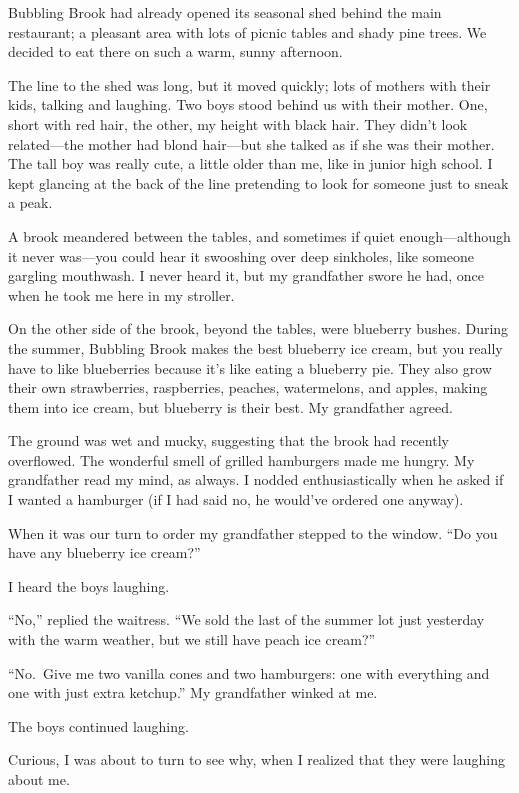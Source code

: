 Bubbling Brook had already opened its seasonal shed behind the main
restaurant; a pleasant area with lots of picnic tables and shady pine
trees. We decided to eat there on such a warm, sunny afternoon.

The line to the shed was long, but it moved quickly; lots of mothers
with their kids, talking and laughing. Two boys stood behind us with
their mother. One, short with red hair, the other, my height with black
hair. They didn't look related---the mother had blond hair---but she
talked as if she was their mother. The tall boy was really cute, a
little older than me, like in junior high school. I kept glancing at the
back of the line pretending to look for someone just to sneak a peak.

A brook meandered between the tables, and sometimes if quiet
enough---although it never was---you could hear it swooshing over deep
sinkholes, like someone gargling mouthwash. I never heard it, but my
grandfather swore he had, once when he took me here in my stroller.

On the other side of the brook, beyond the tables, were blueberry
bushes. During the summer, Bubbling Brook makes the best blueberry ice
cream, but you really have to like blueberries because it's like eating
a blueberry pie. They also grow their own strawberries, raspberries,
peaches, watermelons, and apples, making them into ice cream, but
blueberry is their best. My grandfather agreed.

The ground was wet and mucky, suggesting that the brook had recently
overflowed. The wonderful smell of grilled hamburgers made me hungry. My
grandfather read my mind, as always. I nodded enthusiastically when he
asked if I wanted a hamburger (if I had said no, he would've ordered one
anyway).

When it was our turn to order my grandfather stepped to the window. ``Do
you have any blueberry ice cream?''

I heard the boys laughing.

``No,'' replied the waitress. ``We sold the last of the summer lot just
yesterday with the warm weather, but we still have peach ice cream?''

``No.~Give me two vanilla cones and two hamburgers: one with everything
and one with just extra ketchup.'' My grandfather winked at me.

The boys continued laughing.

Curious, I was about to turn to see why, when I realized that they were
laughing about me.

